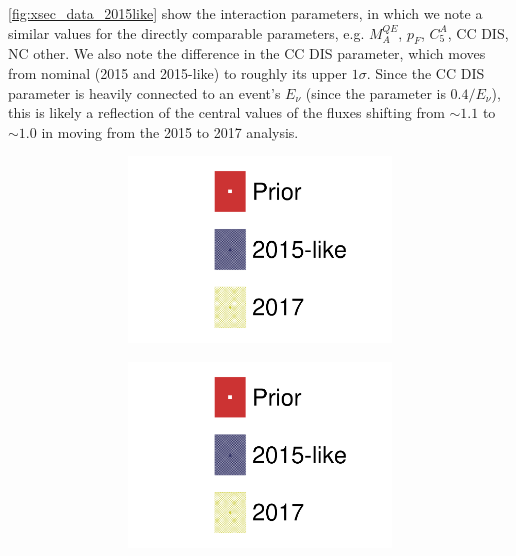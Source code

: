 \autoref{fig:xsec_data_2015like} show the interaction parameters, in which we note a similar values for the directly comparable parameters, e.g. $M_A^{QE}$, $p_F$, $C_5^A$, CC DIS, NC other.  We also note the difference in the CC DIS parameter, which moves from nominal (2015 and 2015-like) to roughly its upper $1\sigma$. Since the CC DIS parameter is heavily connected to an event's $E_\nu$ (since the parameter is $0.4/E_\nu$), this is likely a reflection of the central values of the fluxes shifting from $\sim1.1$ to $\sim1.0$ in moving from the 2015 to 2017 analysis.
\begin{figure}[h]
	\begin{subfigure}[t]{\textwidth}
	\begin{subfigure}[t]{0.24\textwidth}
		\includegraphics[width=\textwidth, trim={0mm 0mm 0mm 0mm}, clip,page=18]{figures/mach3/data/alt/2017b_NewData_NewDet_hpc_2015like__2017b_NewData_NewDet_UpdXsecStep_2Xsec_4Det_5Flux_0.pdf}
	\end{subfigure}
	\begin{subfigure}[t]{0.24\textwidth}
		\includegraphics[width=\textwidth, trim={0mm 0mm 0mm 0mm}, clip,page=19]{figures/mach3/data/alt/2017b_NewData_NewDet_hpc_2015like__2017b_NewData_NewDet_UpdXsecStep_2Xsec_4Det_5Flux_0.pdf}

\end{subfigure}
\end{subfigure}
\end{figure}
